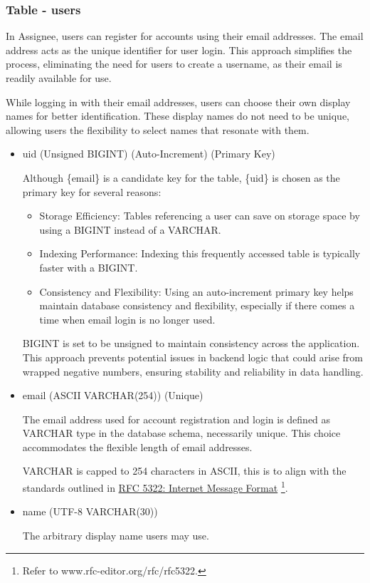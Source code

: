 \documentclass[12pt]{report}
\newcommand{\n}{\par}
\begin{document}
\subsubsection{Table - users} \label{data-layer.design.user-system.users}
In Assignee, users can register for accounts using their email addresses.
The email address acts as the unique identifier for user login.
This approach simplifies the process, eliminating the need for users to create a username,
as their email is readily available for use.\n
While logging in with their email addresses, users can choose their own display names for better identification.
These display names do not need to be unique, allowing users the flexibility to select names that resonate with them.
\begin{itemize}
	\item uid (Unsigned BIGINT) (Auto-Increment) (Primary Key)\n
	      Although \{email\} is a candidate key for the table, \{uid\} is chosen as the primary key for several reasons:\n
	      \begin{itemize}
		      \item Storage Efficiency: Tables referencing a user can save on storage space by using a BIGINT instead of a VARCHAR.
		      \item Indexing Performance: Indexing this frequently accessed table is typically faster with a BIGINT.
		      \item Consistency and Flexibility: Using an auto-increment primary key helps maintain data\-base consistency and flexibility, especially if there comes a time when email login is no longer used.
	      \end{itemize}\n
	      BIGINT is set to be unsigned to maintain consistency across the application.
	      This approach prevents potential issues in backend logic that could arise from wrapped negative numbers,
	      ensuring stability and reliability in data handling.
	\item email (ASCII VARCHAR(254)) (Unique)\n
	      The email address used for account registration and login is defined as VARCHAR type in the database schema, necessarily unique.
	      This choice accommodates the flexible length of email addresses.\n
	      VARCHAR is capped to 254 characters in ASCII, this is to align with the standards outlined in
	      \href{https://www.rfc-editor.org/rfc/rfc5322}{RFC 5322: Internet Message Format}
	      \footnote{Refer to www.rfc-editor.org/rfc/rfc5322.}.
	\item name (UTF-8 VARCHAR(30))\n
	      The arbitrary display name users may use.

\end{itemize}
\end{document}
